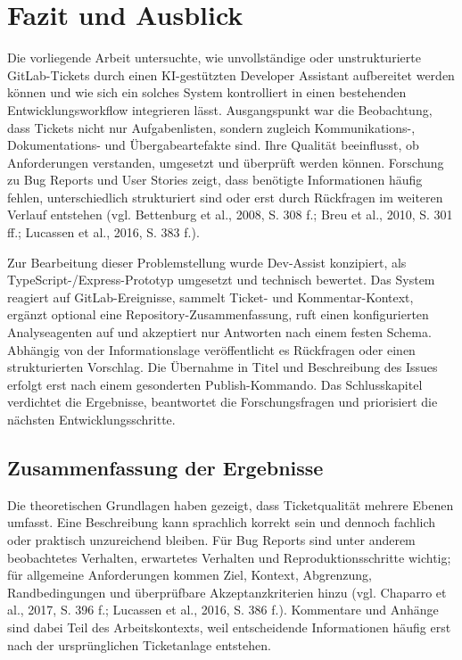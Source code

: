 \chapter{Fazit und Ausblick}

Die vorliegende Arbeit untersuchte, wie unvollständige oder unstrukturierte GitLab-Tickets durch einen KI-gestützten Developer Assistant aufbereitet werden können und wie sich ein solches System kontrolliert in einen bestehenden Entwicklungsworkflow integrieren lässt. Ausgangspunkt war die Beobachtung, dass Tickets nicht nur Aufgabenlisten, sondern zugleich Kommunikations-, Dokumentations- und Übergabeartefakte sind. Ihre Qualität beeinflusst, ob Anforderungen verstanden, umgesetzt und überprüft werden können. Forschung zu Bug Reports und User Stories zeigt, dass benötigte Informationen häufig fehlen, unterschiedlich strukturiert sind oder erst durch Rückfragen im weiteren Verlauf entstehen (vgl. Bettenburg et al., 2008, S. 308 f.; Breu et al., 2010, S. 301 ff.; Lucassen et al., 2016, S. 383 f.).

Zur Bearbeitung dieser Problemstellung wurde Dev-Assist konzipiert, als TypeScript-/Express-Prototyp umgesetzt und technisch bewertet. Das System reagiert auf GitLab-Ereignisse, sammelt Ticket- und Kommentar-Kontext, ergänzt optional eine Repository-Zusammenfassung, ruft einen konfigurierten Analyseagenten auf und akzeptiert nur Antworten nach einem festen Schema. Abhängig von der Informationslage veröffentlicht es Rückfragen oder einen strukturierten Vorschlag. Die Übernahme in Titel und Beschreibung des Issues erfolgt erst nach einem gesonderten Publish-Kommando. Das Schlusskapitel verdichtet die Ergebnisse, beantwortet die Forschungsfragen und priorisiert die nächsten Entwicklungsschritte.

\section{Zusammenfassung der Ergebnisse}

Die theoretischen Grundlagen haben gezeigt, dass Ticketqualität mehrere Ebenen umfasst. Eine Beschreibung kann sprachlich korrekt sein und dennoch fachlich oder praktisch unzureichend bleiben. Für Bug Reports sind unter anderem beobachtetes Verhalten, erwartetes Verhalten und Reproduktionsschritte wichtig; für allgemeine Anforderungen kommen Ziel, Kontext, Abgrenzung, Randbedingungen und überprüfbare Akzeptanzkriterien hinzu (vgl. Chaparro et al., 2017, S. 396 f.; Lucassen et al., 2016, S. 386 f.). Kommentare und Anhänge sind dabei Teil des Arbeitskontexts, weil entscheidende Informationen häufig erst nach der ursprünglichen Ticketanlage entstehen.

